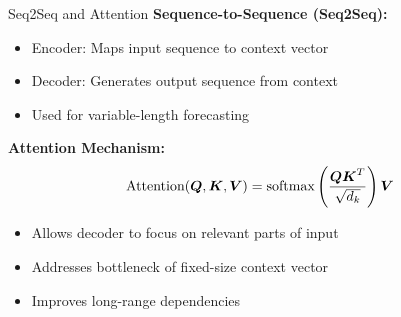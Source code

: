 \documentclass[aspectratio=169]{beamer}
\begin{document}
\begin{frame}{Seq2Seq and Attention}
  \textbf{Sequence-to-Sequence (Seq2Seq):}
  \begin{itemize}
    \item Encoder: Maps input sequence to context vector
    \item Decoder: Generates output sequence from context
    \item Used for variable-length forecasting
  \end{itemize}

  \vspace{0.5em}

  \textbf{Attention Mechanism:}
  \begin{equation}
    \text{Attention}(\boldsymbol{Q}, \boldsymbol{K}, \boldsymbol{V}) = \text{softmax}\left(\frac{\boldsymbol{Q}\boldsymbol{K}^T}{\sqrt{d_k}}\right)\boldsymbol{V}
  \end{equation}

  \begin{itemize}
    \item Allows decoder to focus on relevant parts of input
    \item Addresses bottleneck of fixed-size context vector
    \item Improves long-range dependencies
  \end{itemize}
\end{frame}
\end{document}
